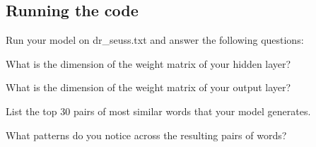 \begin{solution}

\end{solution}

\subsection{Running the code}
Run your model on dr_seuss.txt and answer the following questions:

\problem[2]
What is the dimension of the weight matrix of your hidden layer?

\begin{solution}


\end{solution}

\problem[2]
What is the dimension of the weight matrix of your output layer?
\begin{solution}


\end{solution}

\problem[1]
List the top 30 pairs of most similar words that your model generates.
\begin{solution}



\end{solution}

\problem[2]
What patterns do you notice across the resulting pairs of words?
\begin{solution}



\end{solution}



